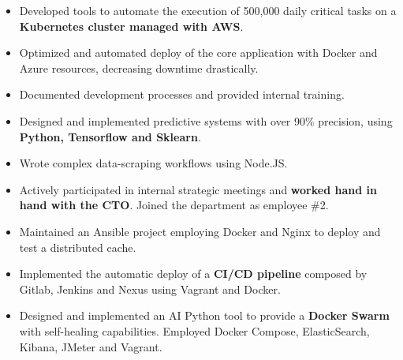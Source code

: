 \documentclass[10pt,a4paper]{altacv}
\begin{document}
\begin{itemize}
\item Developed tools to automate the execution of 500,000 daily critical tasks on a \textbf{Kubernetes cluster managed with AWS}.
\item Optimized and automated deploy of the core application with Docker and Azure resources, decreasing downtime drastically.
\item Documented development processes and provided internal training.
\item Designed and implemented predictive systems with over 90\% precision, using \textbf{Python, Tensorflow and Sklearn}.
\item Wrote complex data-scraping workflows using Node.JS.
\item Actively participated in internal strategic meetings and \textbf{worked hand in hand with the CTO}. Joined the department as employee \#2.
\end{itemize}

\divider

\begin{itemize}
\item Maintained an Ansible project employing Docker and Nginx to deploy and test a distributed cache.
\item Implemented the automatic deploy of a \textbf{CI/CD pipeline} composed by Gitlab, Jenkins and Nexus using Vagrant and Docker.
\item Designed and implemented an AI Python tool to provide a \textbf{Docker Swarm} with self-healing capabilities. Employed Docker Compose, ElasticSearch, Kibana, JMeter and Vagrant.
\end{itemize}

%


\nocite{*}

\printbibliography[heading=pubtype,title={\printinfo{\faBook}{Dissertations}},type=book]
\end{document}
